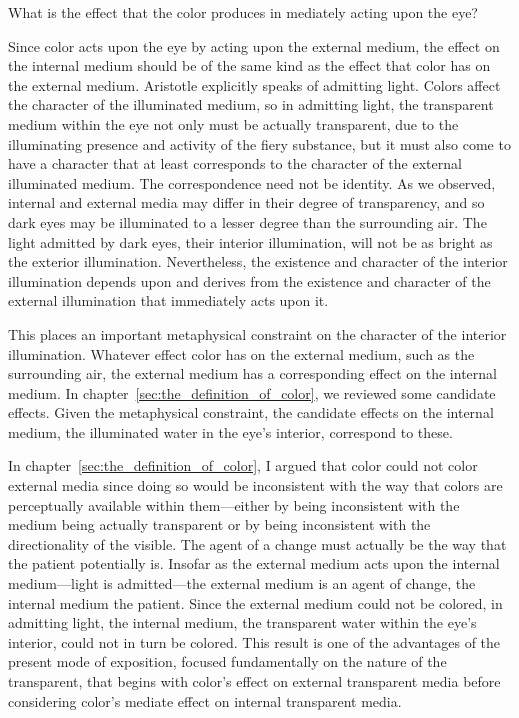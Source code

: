 What is the effect that the color produces in mediately acting upon the eye?

Since color acts upon the eye by acting upon the external me\-di\-um, the effect on the internal medium should be of the same kind as the effect that color has on the external medium. Aristotle explicitly speaks of admitting light. Colors affect the character of the illuminated medium, so in admitting light, the transparent medium within the eye not only must be actually transparent, due to the illuminating presence and activity of the fiery substance, but it must also come to have a character that at least corresponds to the character of the external illuminated medium. The correspondence need not be identity. As we observed, internal and external media may differ in their degree of transparency, and so dark eyes may be illuminated to a lesser degree than the surrounding air. The light admitted by dark eyes, their interior illumination, will not be as bright as the exterior illumination. Nevertheless, the existence and character of the interior illumination depends upon and derives from the existence and character of the external illumination that immediately acts upon it.

This places an important metaphysical constraint on the character of the interior illumination. Whatever effect color has on the external medium, such as the surrounding air, the external medium has a corresponding effect on the internal medium. In chapter~\ref{sec:the_definition_of_color}, we reviewed some candidate effects. Given the metaphysical constraint, the candidate effects on the internal medium, the illuminated water in the eye's interior, correspond to these.

In chapter~\ref{sec:the_definition_of_color}, I argued that color could not color external media since doing so would be inconsistent with the way that colors are perceptually available within them---either by being inconsistent with the medium being actually transparent or by being inconsistent with the directionality of the visible. The agent of a change must actually be the way that the patient potentially is. Insofar as the external medium acts upon the internal medium---light is admitted---the external medium is an agent of change, the internal medium the patient. Since the external medium could not be colored, in admitting light, the internal medium, the transparent water within the eye's interior, could not in turn be colored. This result is one of the advantages of the present mode of exposition, focused fundamentally on the nature of the transparent, that begins with color's effect on external transparent media before considering color's mediate effect on internal transparent media.

